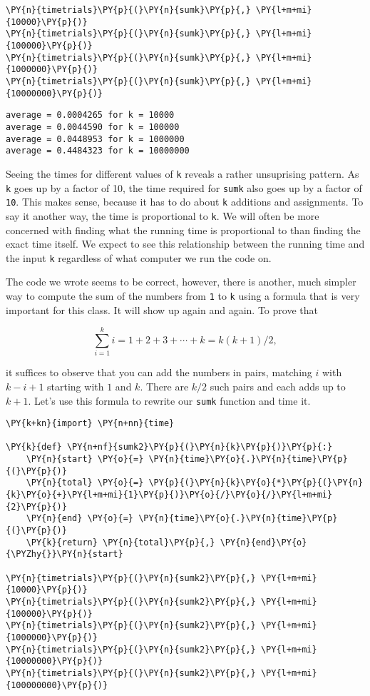\begin{Verbatim}[commandchars=\\\{\}]
\PY{n}{timetrials}\PY{p}{(}\PY{n}{sumk}\PY{p}{,} \PY{l+m+mi}{10000}\PY{p}{)}
\PY{n}{timetrials}\PY{p}{(}\PY{n}{sumk}\PY{p}{,} \PY{l+m+mi}{100000}\PY{p}{)}
\PY{n}{timetrials}\PY{p}{(}\PY{n}{sumk}\PY{p}{,} \PY{l+m+mi}{1000000}\PY{p}{)}
\PY{n}{timetrials}\PY{p}{(}\PY{n}{sumk}\PY{p}{,} \PY{l+m+mi}{10000000}\PY{p}{)}
\end{Verbatim}

\begin{Verbatim}
average = 0.0004265 for k = 10000
average = 0.0044590 for k = 100000
average = 0.0448953 for k = 1000000
average = 0.4484323 for k = 10000000

\end{Verbatim}


Seeing the times for different values of \texttt{k} reveals a rather unsuprising pattern.
As \texttt{k} goes up by a factor of 10, the time required for \texttt{sumk} also goes up by a factor of \texttt{10}.
This makes sense, because it has to do about \texttt{k} additions and assignments.
To say it another way, the time is proportional to \texttt{k}.
We will often be more concerned with finding what the running time is proportional to than finding the exact time itself.
We expect to see this relationship between the running time and the input \texttt{k} regardless of what computer we run the code on.


The code we wrote seems to be correct, however, there is another, much simpler way to compute the sum of the numbers from \texttt{1} to \texttt{k} using a formula that is very important for this class.
It will show up again and again.
To prove that


\[
\sum_{i = 1}^k i = 1 + 2 + 3 + \cdots + k = k (k + 1) / 2,
\]


it suffices to observe that you can add the numbers in pairs, matching $i$ with $k-i + 1$ starting with $1$ and $k$.
There are $k/2$ such pairs and each adds up to $k+1$.
Let's use this formula to rewrite our \texttt{sumk} function and time it.


\begin{Verbatim}[commandchars=\\\{\}]
\PY{k+kn}{import} \PY{n+nn}{time}

\PY{k}{def} \PY{n+nf}{sumk2}\PY{p}{(}\PY{n}{k}\PY{p}{)}\PY{p}{:}
    \PY{n}{start} \PY{o}{=} \PY{n}{time}\PY{o}{.}\PY{n}{time}\PY{p}{(}\PY{p}{)}
    \PY{n}{total} \PY{o}{=} \PY{p}{(}\PY{n}{k}\PY{o}{*}\PY{p}{(}\PY{n}{k}\PY{o}{+}\PY{l+m+mi}{1}\PY{p}{)}\PY{o}{/}\PY{o}{/}\PY{l+m+mi}{2}\PY{p}{)}
    \PY{n}{end} \PY{o}{=} \PY{n}{time}\PY{o}{.}\PY{n}{time}\PY{p}{(}\PY{p}{)}
    \PY{k}{return} \PY{n}{total}\PY{p}{,} \PY{n}{end}\PY{o}{\PYZhy{}}\PY{n}{start}

\PY{n}{timetrials}\PY{p}{(}\PY{n}{sumk2}\PY{p}{,} \PY{l+m+mi}{10000}\PY{p}{)}
\PY{n}{timetrials}\PY{p}{(}\PY{n}{sumk2}\PY{p}{,} \PY{l+m+mi}{100000}\PY{p}{)}
\PY{n}{timetrials}\PY{p}{(}\PY{n}{sumk2}\PY{p}{,} \PY{l+m+mi}{1000000}\PY{p}{)}
\PY{n}{timetrials}\PY{p}{(}\PY{n}{sumk2}\PY{p}{,} \PY{l+m+mi}{10000000}\PY{p}{)}
\PY{n}{timetrials}\PY{p}{(}\PY{n}{sumk2}\PY{p}{,} \PY{l+m+mi}{100000000}\PY{p}{)}
\end{Verbatim}

